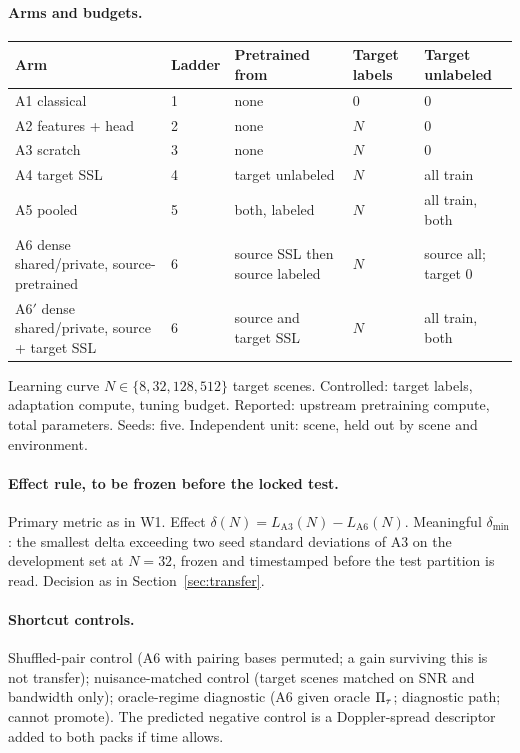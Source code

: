 \documentclass[11pt,a4paper]{article}
\begin{document}
\paragraph{Arms and budgets.}
\begin{center}\small
\begin{tabular}{@{}p{5cm}lp{3.2cm}ll@{}}
\toprule
Arm & Ladder & Pretrained from & Target labels & Target unlabeled \\
\midrule
A1 classical & 1 & none & 0 & 0 \\
A2 features + head & 2 & none & $N$ & 0 \\
A3 scratch & 3 & none & $N$ & 0 \\
A4 target SSL & 4 & target unlabeled & $N$ & all train \\
A5 pooled & 5 & both, labeled & $N$ & all train, both \\
A6 dense shared/private, source-pretrained & 6 & source SSL then source labeled & $N$ & source all; target 0 \\
A6$'$ dense shared/private, source + target SSL & 6 & source and target SSL & $N$ & all train, both \\
\bottomrule
\end{tabular}
\end{center}
Learning curve $N\in\{8,32,128,512\}$ target scenes. Controlled: target labels, adaptation compute, tuning budget. Reported: upstream pretraining compute, total parameters. Seeds: five. Independent unit: scene, held out by scene and environment.

\paragraph{Effect rule, to be frozen before the locked test.} Primary metric as in W1. Effect $\delta(N)=L_{\mathrm{A3}}(N)-L_{\mathrm{A6}}(N)$. Meaningful $\delta_{\min}$: the smallest delta exceeding two seed standard deviations of A3 on the development set at $N=32$, frozen and timestamped before the test partition is read. Decision as in Section~\ref{sec:transfer}.

\paragraph{Shortcut controls.} Shuffled-pair control (A6 with pairing bases permuted; a gain surviving this is not transfer); nuisance-matched control (target scenes matched on SNR and bandwidth only); oracle-regime diagnostic (A6 given oracle $\Pi_{\tau}$; diagnostic path; cannot promote). The predicted negative control is a Doppler-spread descriptor added to both packs if time allows.
\end{document}
